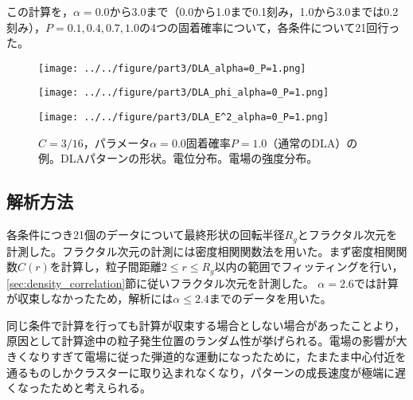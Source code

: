 \documentclass[autodetect-engine,dvi=dvipdfmx,a4paper,ja=standard,oneside,openany,11pt]{bxjsbook}
\begin{document}
この計算を，$\alpha=0.0$から$3.0$まで（0.0から1.0まで0.1刻み，1.0から3.0までは0.2刻み），$P=0.1,0.4,0.7,1.0$の4つの固着確率について，各条件について21回行った。

\begin{figure}[htbp]
  \begin{minipage}{0.32\hsize}
    \subcaption{}
    \centering
    \texttt{[image: ../../figure/part3/DLA\_alpha=0\_P=1.png]}
    \label{fig:DLA_alpha_0_P_1}
  \end{minipage}
  \begin{minipage}{0.32\hsize}
    \subcaption{}
    \centering
    \texttt{[image: ../../figure/part3/DLA\_phi\_alpha=0\_P=1.png]}
    \label{fig:DLA_phi_alpha_0_P_1}
  \end{minipage}
  \begin{minipage}{0.32\hsize}
    \subcaption{}
    \centering
    \texttt{[image: ../../figure/part3/DLA\_E^2\_alpha=0\_P=1.png]}
    \label{fig:DLA_E_alpha_0_P_1}
  \end{minipage}
  \caption{$C=3/16$，パラメータ$\alpha=0.0$固着確率$P=1.0$（通常のDLA）の例。DLAパターンの形状。電位分布。電場の強度分布。}
  \label{fig:DLA_ex}
\end{figure}

\subsection{解析方法}
各条件につき21個のデータについて最終形状の回転半径$R_g$とフラクタル次元を計測した。フラクタル次元の計測には密度相関関数法を用いた。まず密度相関関数$C(r)$を計算し，粒子間距離$2\leq r\leq R_g$以内の範囲でフィッティングを行い，\ref{sec:density_correlation}節に従いフラクタル次元を計測した。
$\alpha=2.6$では計算が収束しなかったため，解析には$\alpha\leq2.4$までのデータを用いた。

同じ条件で計算を行っても計算が収束する場合としない場合があったことより，原因として計算途中の粒子発生位置のランダム性が挙げられる。電場の影響が大きくなりすぎて電場に従った弾道的な運動になったために，たまたま中心付近を通るものしかクラスターに取り込まれなくなり，パターンの成長速度が極端に遅くなったためと考えられる。

\ifdraft{
  
  
}{}
\end{document}
